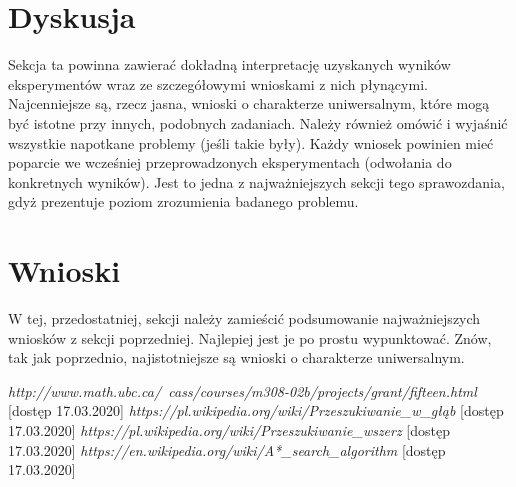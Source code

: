 \documentclass{classrep}
\begin{document}
\newpage
\section{Dyskusja}
{\color{blue}
Sekcja ta powinna zawierać dokładną interpretację uzyskanych wyników
eksperymentów wraz ze szczegółowymi wnioskami z nich płynącymi. Najcenniejsze
są, rzecz jasna, wnioski o charakterze uniwersalnym, które mogą być istotne
przy innych, podobnych zadaniach. Należy również omówić i wyjaśnić wszystkie
napotkane problemy (jeśli takie były). Każdy wniosek powinien mieć poparcie we
wcześniej przeprowadzonych eksperymentach (odwołania do konkretnych wyników).
Jest to jedna z najważniejszych sekcji tego sprawozdania, gdyż prezentuje
poziom zrozumienia badanego problemu.}

\section{Wnioski}
{\color{blue}
W tej, przedostatniej, sekcji należy zamieścić podsumowanie najważniejszych
wniosków z sekcji poprzedniej. Najlepiej jest je po prostu wypunktować. Znów,
tak jak poprzednio, najistotniejsze są wnioski o charakterze uniwersalnym.}

\begin{thebibliography}{0}
  	
	 \textsl{http://www.math.ubc.ca/~cass/courses/m308-02b/projects/grant/fifteen.html} [dostęp 17.03.2020]
	 \textsl{https://pl.wikipedia.org/wiki/Przeszukiwanie\_w\_głąb} [dostęp 17.03.2020]
	 \textsl{https://pl.wikipedia.org/wiki/Przeszukiwanie\_wszerz} [dostęp 17.03.2020]
			\textsl{https://en.wikipedia.org/wiki/A*\_search\_algorithm} [dostęp 17.03.2020]
\end{thebibliography}
\end{document}

